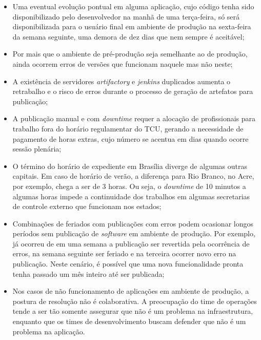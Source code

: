 \begin{itemize}
\item Uma eventual evolução pontual em alguma aplicação, cujo código tenha sido
disponibilizado pelo desenvolvedor na manhã de uma terça-feira, só será
disponibilizada para o usuário final em ambiente de produção na sexta-feira da
semana seguinte, uma demora de dez dias que nem sempre é aceitável;

\item Por mais que o ambiente de pré-produção seja semelhante ao de produção,
ainda ocorrem erros de versões que funcionam naquele mas não neste;

\item A existência de servidores \textit{artifactory} e \textit{jenkins}
duplicados aumenta o retrabalho e o risco de erros durante o processo de
geração de artefatos para publicação;

\item A publicação manual e com \textit{downtime} requer a alocação de
profissionais para trabalho fora do horário regulamentar do \acrshort{TCU},
gerando a necessidade de pagamento de horas extras, cujo número se acentua
em dias quando ocorre sessão plenária;

\item O término do horário de expediente em Brasília diverge de algumas outras
capitais. Em caso de horário de verão, a diferença para Rio Branco, no Acre,
por exemplo, chega a ser de 3 horas. Ou seja, o \textit{downtime} de 10 minutos
a algumas horas impede a continuidade dos trabalhos em algumas secretarias
de controle externo que funcionam nos estados;

\item Combinações de feriados com publicações com erros podem ocasionar longos
períodos sem publicação de \textit{software} em ambiente de produção. Por exemplo, já
ocorreu de em uma semana a publicação ser revertida pela ocorrência de erros,
na semana seguinte ser feriado e na terceira ocorrer novo erro na publicação.
Neste cenário, é possível que uma nova funcionalidade pronta tenha passado um mês
inteiro até ser publicada;

\item Nos casos de não funcionamento de aplicações em ambiente de produção,
a postura de resolução não é colaborativa. A preocupação do time de operações
tende a ser tão somente assegurar que não é um problema na infraestrutura,
enquanto que os times de desenvolvimento buscam defender que não é um problema
na aplicação.

\end{itemize}

